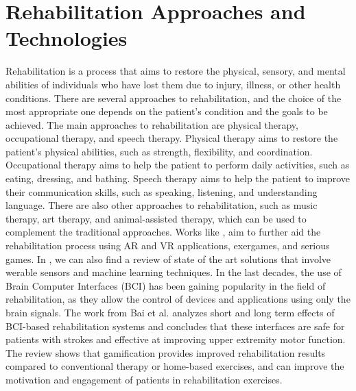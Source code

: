 \section{Rehabilitation Approaches and Technologies}
Rehabilitation is a process that aims to restore the physical, sensory, and mental abilities of individuals who have lost them due to injury, illness, or other health conditions.
There are several approaches to rehabilitation, and the choice of the most appropriate one depends on the patient's condition and the goals to be achieved.
The main approaches to rehabilitation are physical therapy, occupational therapy, and speech therapy.
Physical therapy aims to restore the patient's physical abilities, such as strength, flexibility, and coordination.
Occupational therapy aims to help the patient to perform daily activities, such as eating, dressing, and bathing.
Speech therapy aims to help the patient to improve their communication skills, such as speaking, listening, and understanding language.
There are also other approaches to rehabilitation, such as music therapy, art therapy, and animal-assisted therapy, which can be used to complement the traditional approaches.
Works like \cite{202306.0333, 5567156, 10.4108/icst.pervasivehealth.2014.255277, trombetta}, aim to further aid the rehabilitation process using AR and VR applications, exergames, and serious games.
In \cite{BOUKHENNOUFA2022103197}, we can also find a review of state of the art solutions that involve werable sensors and machine learning techniques.
In the last decades, the use of Brain Computer Interfaces (BCI) has been gaining popularity in the field of rehabilitation, as they allow the control of devices and applications using only the brain signals.
The work from Bai et al. \cite{bai_immediate_2020} analyzes short and long term effects of BCI-based rehabilitation systems and concludes that these interfaces are safe for patients with strokes and effective at improving upper extremity motor function.
The review \cite{alfieri_gamification_2022} shows that gamification provides improved rehabilitation results compared to conventional therapy or home-based exercises, and can improve the motivation and engagement of patients in rehabilitation exercises.

